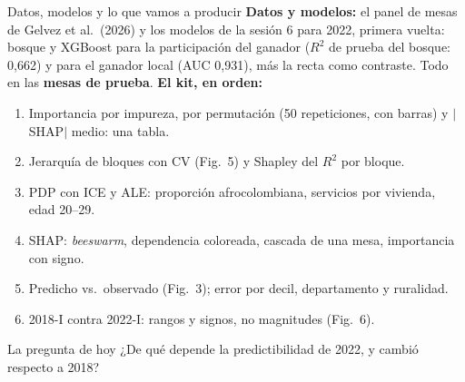 \documentclass{beamer}
\newcommand{\1}{\mathbb{I}}
\begin{document}
\begin{frame}{Datos, modelos y lo que vamos a producir}
\small
\textbf{Datos y modelos:} el panel de mesas de Gelvez et al.\ (2026) y los modelos de la sesión 6 para 2022, primera vuelta: bosque y XGBoost para la participación del ganador ($R^2$ de prueba del bosque: 0,662) y para el ganador local (AUC 0,931), más la recta como contraste. Todo en las \textbf{mesas de prueba}.
\pause
\textbf{El kit, en orden:}
\begin{enumerate}\itemsep1pt
  \item Importancia por impureza, por permutación (50 repeticiones, con barras) y $|$SHAP$|$ medio: una tabla.
  \item Jerarquía de bloques con CV (Fig.\ 5) y Shapley del $R^2$ por bloque.
  \item PDP con ICE y ALE: proporción afrocolombiana, servicios por vivienda, edad 20--29.
  \item SHAP: \emph{beeswarm}, dependencia coloreada, cascada de una mesa, importancia con signo.
  \item Predicho vs.\ observado (Fig.\ 3); error por decil, departamento y ruralidad.
  \item 2018-I contra 2022-I: rangos y signos, no magnitudes (Fig.\ 6).
\end{enumerate}
\pause
\begin{block}{La pregunta de hoy}
¿De qué depende la predictibilidad de 2022, y cambió respecto a 2018?
\end{block}
\end{frame}
\end{document}
